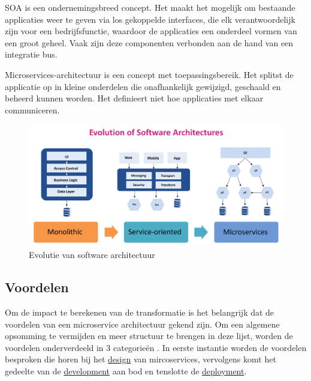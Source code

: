 SOA is een ondernemingsbreed concept. Het maakt het mogelijk om bestaande applicaties weer te geven via los gekoppelde interfaces, die elk verantwoordelijk zijn voor een bedrijfsfunctie, waardoor de applicaties een onderdeel vormen van een groot geheel. Vaak zijn deze componenten verbonden aan de hand van een integratie bus.

Microservices-architectuur is een concept met toepassingsbereik. Het splitst de applicatie op in kleine onderdelen die onafhankelijk gewijzigd, geschaald en beheerd kunnen worden. Het definieert niet hoe applicaties met elkaar communiceren.
\begin{figure}[!htb]
    \includegraphics[width=1\textwidth]{Evolution-of-Software-architectur.png}
    \caption{Evolutie van software architectuur \label{evolution}}
\end{figure}


\subsection{Voordelen}
Om de impact te berekenen van de transformatie is het belangrijk dat de voordelen van een microservice architectuur gekend zijn. Om een algemene opsomming te vermijden en meer structuur te brengen in deze lijst, worden de voordelen onderverdeeld in 3 categorieën . In eerste instantie worden de voordelen besproken die horen bij het \underline{design} van mircoservices, vervolgens komt het gedeelte van de \underline{development} aan bod en tenslotte de \underline{deployment}.\\

